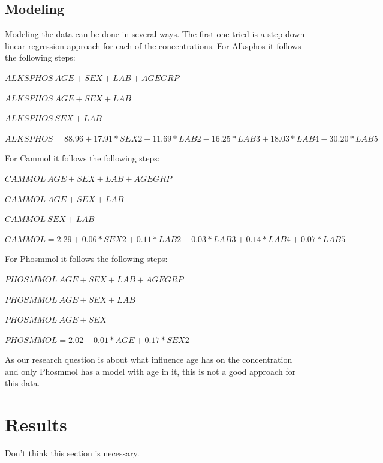 \documentclass{article}
\begin{document}
    \subsection{Modeling}
      Modeling the data can be done in several ways.
      The first one tried is a step down linear regression approach for each of the concentrations.
      For Alksphos it follows the following steps:
      \begin{itemize}
        \tiny{\item $ALKSPHOS ~ AGE + SEX + LAB + AGEGRP$}
        \tiny{\item $ALKSPHOS ~ AGE + SEX + LAB$}
        \tiny{\item $ALKSPHOS ~ SEX + LAB$}
        \tiny{\item $ALKSPHOS = 88.96 + 17.91*SEX2 - 11.69*LAB2 - 16.25*LAB3 + 18.03*LAB4 - 30.20*LAB5$}
      \end{itemize}
      For Cammol it follows the following steps:
      \begin{itemize}
        \tiny{\item $CAMMOL ~ AGE + SEX + LAB + AGEGRP$}
        \tiny{\item $CAMMOL ~ AGE + SEX + LAB$}
        \tiny{\item $CAMMOL ~ SEX + LAB$}
        \tiny{\item $CAMMOL = 2.29 + 0.06*SEX2 + 0.11*LAB2 + 0.03*LAB3 + 0.14*LAB4 + 0.07*LAB5$}
      \end{itemize}
      For Phosmmol it follows the following steps:
      \begin{itemize}
        \tiny{\item $PHOSMMOL ~ AGE + SEX + LAB + AGEGRP$}
        \tiny{\item $PHOSMMOL ~ AGE + SEX + LAB$}
        \tiny{\item $PHOSMMOL ~ AGE + SEX$}
        \tiny{\item $PHOSMMOL = 2.02 - 0.01*AGE + 0.17*SEX2$}
      \end{itemize}
      As our research question is about what influence age has on the concentration and only Phosmmol has a model with age in it, this is not a good approach for this data.

  \section{Results}
    Don't think this section is necessary.
\end{document}
